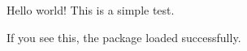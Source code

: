\documentclass{article}
\begin{document}
Hello world! This is a simple test.

If you see this, the package loaded successfully.
\end{document}
